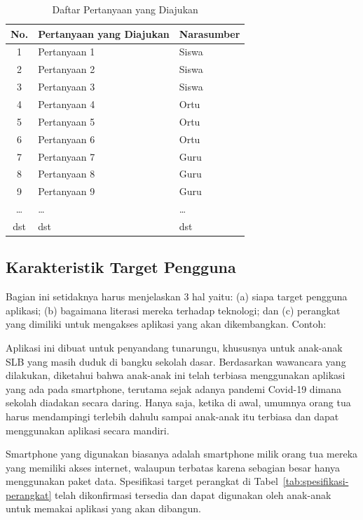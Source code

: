 \documentclass[a4paper,11pt,oneside]{report}
\begin{document}
\begin{table}[H]
    \caption{Daftar Pertanyaan yang Diajukan}
    \label{tab:daftar-pertanyaan}
    \centering
    \footnotesize
    \begin{tabular}{|c|p{6cm}|p{3cm}|}
        \hline
        \textbf{No.} & \textbf{Pertanyaan yang Diajukan} & \textbf{Narasumber} \\ \hline
        1 & Pertanyaan 1 & Siswa \\ \hline
        2 & Pertanyaan 2 & Siswa \\ \hline
        3 & Pertanyaan 3 & Siswa \\ \hline
        4 & Pertanyaan 4 & Ortu  \\ \hline
        5 & Pertanyaan 5 & Ortu  \\ \hline
        6 & Pertanyaan 6 & Ortu  \\ \hline
        7 & Pertanyaan 7 & Guru  \\ \hline
        8 & Pertanyaan 8 & Guru  \\ \hline
        9 & Pertanyaan 9 & Guru  \\ \hline
        \ldots & \ldots & \ldots \\ \hline
        dst & dst & dst \\ \hline
    \end{tabular}
\end{table}

\subsection{Karakteristik Target Pengguna}
Bagian ini setidaknya harus menjelaskan 3 hal yaitu: (a) siapa target pengguna
aplikasi; (b) bagaimana literasi mereka terhadap teknologi; dan (c) perangkat
yang dimiliki untuk mengakses aplikasi yang akan dikembangkan. Contoh:

Aplikasi ini dibuat untuk penyandang tunarungu, khususnya untuk anak-anak SLB
yang masih duduk di bangku sekolah dasar. Berdasarkan wawancara yang dilakukan,
diketahui bahwa anak-anak ini telah terbiasa menggunakan aplikasi yang ada pada
smartphone, terutama sejak adanya pandemi Covid-19 dimana sekolah diadakan
secara daring. Hanya saja, ketika di awal, umumnya orang tua harus mendampingi
terlebih dahulu sampai anak-anak itu terbiasa dan dapat menggunakan aplikasi
secara mandiri.

Smartphone yang digunakan biasanya adalah smartphone milik orang tua mereka
yang memiliki akses internet, walaupun terbatas karena sebagian besar hanya
menggunakan paket data. Spesifikasi target perangkat di
Tabel~\ref{tab:spesifikasi-perangkat} telah dikonfirmasi tersedia dan dapat
digunakan oleh anak-anak untuk memakai aplikasi yang akan dibangun.
\end{document}
